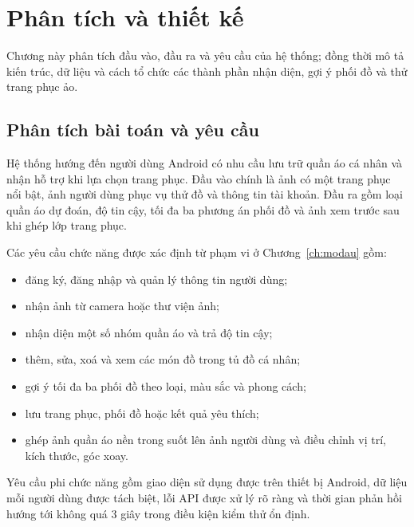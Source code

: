 \chapter{Phân tích và thiết kế}
\label{ch:thietke}

\begin{muctieu}
Chương này phân tích đầu vào, đầu ra và yêu cầu của hệ thống; đồng thời mô
tả kiến trúc, dữ liệu và cách tổ chức các thành phần nhận diện, gợi ý phối
đồ và thử trang phục ảo.
\end{muctieu}

\section{Phân tích bài toán và yêu cầu}

Hệ thống hướng đến người dùng Android có nhu cầu lưu trữ quần áo cá nhân và
nhận hỗ trợ khi lựa chọn trang phục. Đầu vào chính là ảnh có một trang phục
nổi bật, ảnh người dùng phục vụ thử đồ và thông tin tài khoản. Đầu ra gồm
loại quần áo dự đoán, độ tin cậy, tối đa ba phương án phối đồ và ảnh xem
trước sau khi ghép lớp trang phục.

Các yêu cầu chức năng được xác định từ phạm vi ở Chương~\ref{ch:modau} gồm:
\begin{itemize}[leftmargin=1.6em, itemsep=3pt]
  \item đăng ký, đăng nhập và quản lý thông tin người dùng;
  \item nhận ảnh từ camera hoặc thư viện ảnh;
  \item nhận diện một số nhóm quần áo và trả độ tin cậy;
  \item thêm, sửa, xoá và xem các món đồ trong tủ đồ cá nhân;
  \item gợi ý tối đa ba phối đồ theo loại, màu sắc và phong cách;
  \item lưu trang phục, phối đồ hoặc kết quả yêu thích;
  \item ghép ảnh quần áo nền trong suốt lên ảnh người dùng và điều chỉnh vị
        trí, kích thước, góc xoay.
\end{itemize}

Yêu cầu phi chức năng gồm giao diện sử dụng được trên thiết bị Android, dữ
liệu mỗi người dùng được tách biệt, lỗi API được xử lý rõ ràng và thời gian
phản hồi hướng tới không quá 3 giây trong điều kiện kiểm thử ổn định.

